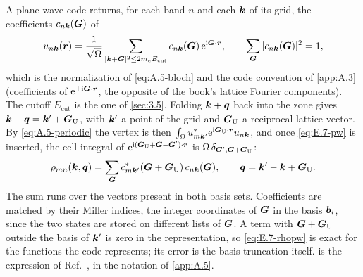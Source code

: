 A plane-wave code returns, for each band $n$ and each $\bm{k}$ of its grid, the coefficients $c_{n\bm{k}}(\bm{G})$ of
\begin{equation}
  u_{n\bm{k}}(\bm{r}) = \frac{1}{\sqrt\Omega}\sum_{|\bm{k}+\bm{G}|^2\le 2m_eE_{\mathrm{cut}}} c_{n\bm{k}}(\bm{G})\,\mathrm{e}^{\mathrm{i}\bm{G}\cdot\bm{r}}, \qquad \sum_{\bm{G}}|c_{n\bm{k}}(\bm{G})|^2 = 1 ,
  \label{eq:E.7-pw}
\end{equation}
which is the normalization of \cref{eq:A.5-bloch} and the code convention of \cref{app:A.3} (coefficients of $\mathrm{e}^{+\mathrm{i}\bm{G}\cdot\bm{r}}$, the opposite of the book's lattice Fourier components). The cutoff $E_{\mathrm{cut}}$ is the one of \cref{sec:3.5}. Folding $\bm{k}+\bm{q}$ back into the zone gives $\bm{k}+\bm{q} = \bm{k}' + \bm{G}_{\mathrm{U}}$, with $\bm{k}'$ a point of the grid and $\bm{G}_{\mathrm{U}}$ a reciprocal-lattice vector. By \cref{eq:A.5-periodic} the vertex is then $\int_\Omega u^*_{m\bm{k}'}\mathrm{e}^{\mathrm{i}\bm{G}_{\mathrm{U}}\cdot\bm{r}}u_{n\bm{k}}$, and once \cref{eq:E.7-pw} is inserted, the cell integral of $\mathrm{e}^{\mathrm{i}(\bm{G}_{\mathrm{U}} + \bm{G} - \bm{G}')\cdot\bm{r}}$ is $\Omega\,\delta_{\bm{G}',\bm{G}+\bm{G}_{\mathrm{U}}}$:
\begin{equation}
  \rho_{mn}(\bm{k},\bm{q}) = \sum_{\bm{G}} c^*_{m\bm{k}'}(\bm{G} + \bm{G}_{\mathrm{U}})\,c_{n\bm{k}}(\bm{G}), \qquad \bm{q} = \bm{k}' - \bm{k} + \bm{G}_{\mathrm{U}} .
  \label{eq:E.7-rhopw}
\end{equation}
The sum runs over the vectors present in both basis sets. Coefficients are matched by their Miller indices, the integer coordinates of $\bm{G}$ in the basis $\bm{b}_i$, since the two states are stored on different lists of $\bm{G}$. A term with $\bm{G}+\bm{G}_{\mathrm{U}}$ outside the basis of $\bm{k}'$ is zero in the representation, so \cref{eq:E.7-rhopw} is exact for the functions the code represents; its error is the basis truncation itself.  is the expression of Ref.~\cite[Eq.~(3.16)]{essig2016direct}, in the notation of \cref{app:A.5}.

